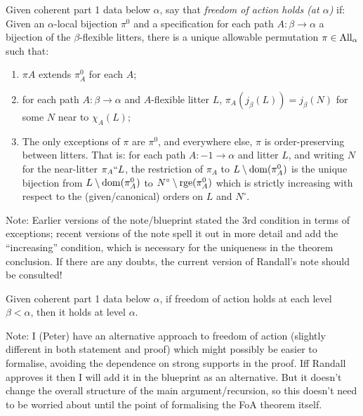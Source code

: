 \begin{definition}
  \label{def:freedom-of-action-statement}
  Given coherent part 1 data below $\alpha$, say that \emph{freedom of action holds (at $\alpha$)} if: Given an $\alpha$-local bijection $\pi^0$ and a specification for each path $A : \beta \to \alpha$ a bijection of the $\beta$-flexible litters, there is a unique allowable permutation $\pi \in \mathrm{All}_\alpha$ such that:
  \begin{enumerate}
   \item $\pi{A}$ extends $\pi^0_{A}$ for each $A$;
   \item for each path $A : \beta \to \alpha$ and $A$-flexible litter $L$, $\pi_A(j_\beta(L)) = j_\beta(N)$ for some $N$ near to $\chi_A(L)$;
   \item The only exceptions of $\pi$ are $\pi^0$, and everywhere else, $\pi$ is order-preserving between litters.  That is: for each path $A : -1 \to \alpha$ and litter $L$, and writing $N$ for the near-litter $\pi_A``L$, the restriction of $\pi_A$ to $L \setminus \mathrm{dom}(\pi^0_A)$ is the unique bijection from $L \setminus \mathrm{dom}(\pi^0_A)$ to $N^\circ \setminus \mathrm{rge}(\pi^0_A)$ which is strictly increasing with respect to the (given/canonical) orders on $L$ and $N^\circ$.
  \end{enumerate}

  Note: Earlier versions of the note/blueprint stated the 3rd condition in terms of exceptions; recent versions of the note spell it out in more detail and add the “increasing” condition, which is necessary for the uniqueness in the theorem conclusion.  If there are any doubts, the current version of Randall’s note should be consulted!
\end{definition}

\begin{lemma}
\label{lem:freedom-of-action-propagates}
Given coherent part 1 data below $\alpha$, if freedom of action holds at each level $\beta < \alpha$, then it holds at level $\alpha$.

Note: I (Peter) have an alternative approach to freedom of action (slightly different in both statement and proof) which might possibly be easier to formalise, avoiding the dependence on strong supports in the proof.  Iff Randall approves it then I will add it in the blueprint as an alternative.  But it doesn’t change the overall structure of the main argument/recursion, so this doesn’t need to be worried about until the point of formalising the FoA theorem itself.
\end{lemma}

